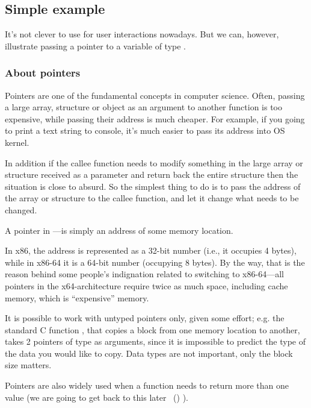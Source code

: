 \subsection{Simple example}



It's not clever to use \scanf for user interactions nowadays. 
But we can, however, illustrate passing a pointer to a variable of type \Tint.

\subsubsection{About pointers}
\myindex{\CLanguageElements!\Pointers}

Pointers are one of the fundamental concepts in computer science.
Often, passing a large array, structure or object as an argument to another function is too expensive, while passing their address is much cheaper.
For example, if you going to print a text string to console, it's much easier to pass its address into \ac{OS} kernel.

In addition if the \gls{callee} function needs to modify something in the large array or structure received as a parameter and return back the entire structure then the situation is close to absurd.
So the simplest thing to do is to pass the address of the array or structure to the \gls{callee} function, and let it change what needs to be changed.

A pointer in \CCpp---is simply an address of some memory location.

In x86, the address is represented as a 32-bit number (i.e., it occupies 4 bytes), while in x86-64 it is a 64-bit number (occupying 8 bytes).
By the way, that is the reason behind some people's indignation related to switching to x86-64---all pointers in the x64-architecture require twice as much space, including cache memory, which is ``expensive'' memory.

It is possible to work with untyped pointers only, given some effort; e.g. the standard C function , that copies a block from one memory location to another,
takes 2 pointers of type  as arguments, since it is impossible to predict the type of the data you would like to copy. Data types are not important, only the block size matters.

Pointers are also widely used when a function needs to return more than one value
(we are going to get back to this later
~()
).

